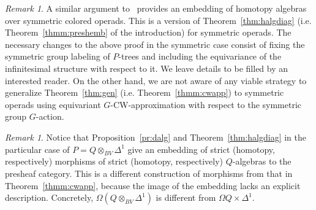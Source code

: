\documentclass{amsart}
\theoremstyle{definition}
\theoremstyle{remark}
\newtheorem{remark}[formula]{Remark}
\begin{document}
	\begin{remark}\label{rem:symcase}
		A similar argument to~\cite[Theorem B.6]{clrrw-22} provides an embedding of homotopy algebras over symmetric colored operads.
		This is a version of Theorem~\ref{thm:halgdiag} (i.e. Theorem~\ref{thmm:preshemb} of the introduction) for symmetric operads.
		The necessary changes to the above proof in the symmetric case consist of fixing the symmetric group labeling of $P$-trees and including the equivariance of the infinitesimal structure with respect to it.
		We leave details to be filled by an interested reader.
		On the other hand, we are not aware of any viable strategy to generalize Theorem~\ref{thm:gen} (i.e. Theorem~\ref{thmm:cwapp}) to symmetric operads using equivariant $G$-CW-approximation with respect to the symmetric group $G$-action.
	\end{remark}

	\begin{remark}
		Notice that Proposition~\ref{pr:dalg} and Theorem~\ref{thm:halgdiag} in the particular case of $P=Q\otimes_{BV}\Delta^{1}$ give an embedding of strict (homotopy, respectively) morphisms of strict (homotopy, respectively) $Q$-algebras to the presheaf category.
		This is a different construction of morphisms from that in Theorem~\ref{thmm:cwapp}, because the image of the embedding lacks an explicit description. 
		Concretely, $\Omega(Q\otimes_{BV}\Delta^{1})$ is different from $\Omega Q\times\Delta^{1}$.
	\end{remark}
\end{document}
